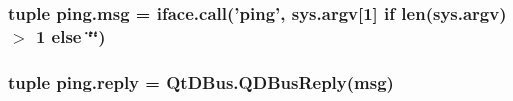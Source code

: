 \subsubsection[{msg}]{\setlength{\rightskip}{0pt plus 5cm}tuple ping.\+msg = iface.\+call('ping', sys.\+argv\mbox{[}1\mbox{]} {\bf if} len(sys.\+argv) $>$ 1 {\bf else} \char`\"{}\char`\"{})}\label{namespaceping_a546aa4b8583f8e76cd3fa14a84836419}
\hypertarget{namespaceping_af1508c5b7666739548f17500c09d5653}{}
\subsubsection[{reply}]{\setlength{\rightskip}{0pt plus 5cm}tuple ping.\+reply = Qt\+D\+Bus.\+Q\+D\+Bus\+Reply({\bf msg})}\label{namespaceping_af1508c5b7666739548f17500c09d5653}
